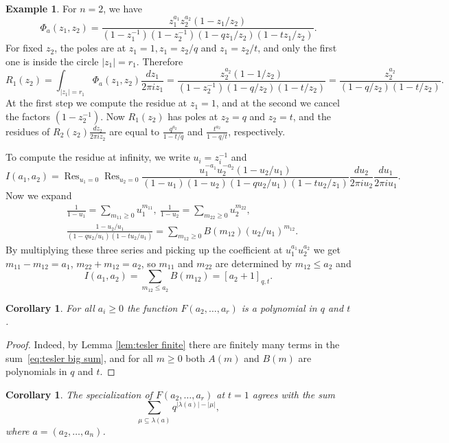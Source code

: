 \documentclass[11pt,reqno]{amsart}
\newtheorem{corollary}[theorem]{Corollary}
\theoremstyle{definition}
\newtheorem{example}[theorem]{Example}
\numberwithin{equation}{section}
\DeclareMathOperator{\Res}{Res}
\begin{document}
\begin{example}
\label{example:residue 2}
For $n=2$, we have
\[
	\Phi_a(z_1,z_2)=
	\frac{z_1^{a_1}z_2^{a_2}(1-z_1/z_2)}{(1-z_1^{-1})(1-z_2^{-1})(1-qz_1/z_2)(1-tz_1/z_2)}.
\]
For fixed $z_2$, the poles are at $z_1=1,z_1=z_2/q$ and $z_1=z_2/t$, and only the first one is inside the circle $|z_1|=r_1$. 
Therefore
\[
	R_1(z_2)=\int_{|z_1|=r_1}\Phi_a(z_1,z_2)\frac{dz_1}{2\pi iz_1}
	=\frac{z_2^{a_2}(1-1/z_2)}{(1-z_2^{-1})(1-q/z_2)(1-t/z_2)}=\frac{z_2^{a_2}}{(1-q/z_2)(1-t/z_2)}.
\]
At the first step we compute the residue at $z_1=1$, and at the second we cancel the factors $(1-z_2^{-1})$. Now 
$R_1(z_2)$ has poles at $z_2=q$ and $z_2=t$, and the residues of $R_2(z_2)\frac{dz_2}{2\pi iz_2}$ are equal to 
$\frac{q^{a_2}}{1-t/q}$ and $\frac{t^{a_2}}{1-q/t}$, respectively.  

To compute the residue at infinity, we write $u_i=z_i^{-1}$ and
\[
	I(a_1,a_2)=\Res_{u_1=0}\Res_{u_2=0}\frac{u_1^{-a_1}u_2^{-a_2}(1-u_2/u_1)}
	{(1-u_1)(1-u_2)(1-qu_2/u_1)(1-tu_2/z_1)}\frac{du_2}{2\pi iu_2}\frac{du_1}{2\pi i u_1}.
\]
Now we expand
\begin{equation*}
\begin{split}
	&\frac{1}{1-u_1}=\sum_{m_{11}\geqslant 0}u_1^{m_{11}},\ 
	\frac{1}{1-u_2}=\sum_{m_{22}\geqslant 0}u_2^{m_{22}},\\
	&\frac{1-u_2/u_1}{(1-qu_2/u_1)(1-tu_2/u_1)}=\sum_{m_{12}\geqslant 0}B(m_{12})(u_2/u_1)^{m_{12}}.
\end{split}
\end{equation*}
By multiplying these three series and picking up the coefficient at $u_1^{a_1}u_2^{a_2}$ we get $m_{11}-m_{12}=a_1$, 
$m_{22}+m_{12}=a_2$, so $m_{11}$ and $m_{22}$ are determined by $m_{12}\leqslant a_2$ and
\[
	I(a_1,a_2)=\sum_{m_{12}\leqslant a_2}B(m_{12})=[a_2+1]_{q,t}.
\]
\end{example}

\begin{corollary}
For all $a_i\geqslant 0$ the function $F(a_2,\ldots,a_r)$ is a polynomial in $q$ and $t$. 
\end{corollary}

\begin{proof}
Indeed, by Lemma \ref{lem:tesler finite} there are finitely many terms in the sum~\eqref{eq:tesler big sum}, and for all 
$m\geqslant 0$ both $A(m)$ and $B(m)$ are polynomials in $q$ and $t$.
\end{proof}

\begin{corollary}
The specialization of $F(a_2,\ldots,a_r)$ at $t=1$ agrees with the sum
\[
	\sum_{\mu\subseteq \lambda(a)}q^{|\lambda(a)|-|\mu|},
\]
where $a=(a_2,\ldots,a_n)$.
\end{corollary}
\end{document}
